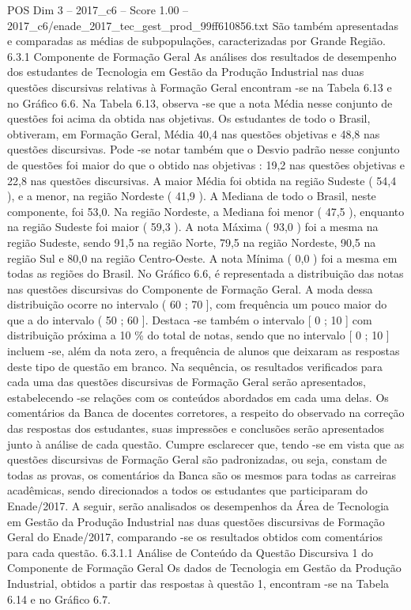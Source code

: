 \begin{textsample}{POS Dim 3 – 2017\_c6 – Score 1.00 – 2017\_c6/enade\_2017\_tec\_gest\_prod\_99ff610856.txt}
São também apresentadas e comparadas as médias de subpopulações, caracterizadas por Grande Região. 6.3.1 Componente de Formação Geral As análises dos resultados de desempenho dos estudantes de Tecnologia em Gestão da Produção Industrial nas duas questões discursivas relativas à Formação Geral encontram -se na Tabela 6.13 e no Gráfico 6.6.
Na Tabela 6.13, observa -se que a nota Média nesse conjunto de questões foi acima da obtida nas objetivas.
Os estudantes de todo o Brasil, obtiveram, em Formação Geral, Média 40,4 nas questões objetivas e 48,8 nas questões discursivas.
Pode -se notar também que o Desvio padrão nesse conjunto de questões foi maior do que o obtido nas objetivas : 19,2 nas questões objetivas e 22,8 nas questões discursivas.
A maior Média foi obtida na região Sudeste ( 54,4 ), e a menor, na região Nordeste ( 41,9 ).
A Mediana de todo o Brasil, neste componente, foi 53,0.
Na região Nordeste, a Mediana foi menor ( 47,5 ), enquanto na região Sudeste foi maior ( 59,3 ).
A nota Máxima ( 93,0 ) foi a mesma na região Sudeste, sendo 91,5 na região Norte, 79,5 na região Nordeste, 90,5 na região Sul e 80,0 na região Centro-Oeste.
A nota Mínima ( 0,0 ) foi a mesma em todas as regiões do Brasil.
No Gráfico 6.6, é representada a distribuição das notas nas questões discursivas do Componente de Formação Geral.
A moda dessa distribuição ocorre no intervalo ( 60 ; 70 ], com frequência um pouco maior do que a do intervalo ( 50 ; 60 ].
Destaca -se também o intervalo [ 0 ; 10 ] com distribuição próxima a 10 \% do total de notas, sendo que no intervalo [ 0 ; 10 ] incluem -se, além da nota zero, a frequência de alunos que deixaram as respostas deste tipo de questão em branco.
Na sequência, os resultados verificados para cada uma das questões discursivas de Formação Geral serão apresentados, estabelecendo -se relações com os conteúdos abordados em cada uma delas.
Os comentários da Banca de docentes corretores, a respeito do observado na correção das respostas dos estudantes, suas impressões e conclusões serão apresentados junto à análise de cada questão.
Cumpre esclarecer que, tendo -se em vista que as questões discursivas de Formação Geral são padronizadas, ou seja, constam de todas as provas, os comentários da Banca são os mesmos para todas as carreiras acadêmicas, sendo direcionados a todos os estudantes que participaram do Enade/2017.
A seguir, serão analisados os desempenhos da Área de Tecnologia em Gestão da Produção Industrial nas duas questões discursivas de Formação Geral do Enade/2017, comparando -se os resultados obtidos com comentários para cada questão. 6.3.1.1 Análise de Conteúdo da Questão Discursiva 1 do Componente de Formação Geral Os dados de Tecnologia em Gestão da Produção Industrial, obtidos a partir das respostas à questão 1, encontram -se na Tabela 6.14 e no Gráfico 6.7.

\end{textsample}
